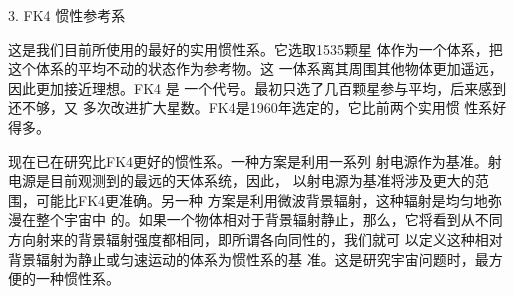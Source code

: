 \documentclass[../outline-of-mechanics.tex]{subfiles}
\begin{document}
\textsf{3. FK4 惯性参考系}

这是我们目前所使用的最好的实用惯性系。它选取1535颗星
体作为一个体系，把这个体系的平均不动的状态作为参考物。这
一体系离其周围其他物体更加遥远，因此更加接近理想。FK4
是
一个代号。最初只选了几百颗星参与平均，后来感到还不够，又
多次改进扩大星数。FK4是1960年选定的，它比前两个实用惯
性系好得多。

现在已在研究比FK4更好的惯性系。一种方案是利用一系列
射电源作为基准。射电源是目前观测到的最远的天体系统，因此，
以射电源为基准将涉及更大的范围，可能比FK4更准确。另一种
方案是利用微波背景辐射，这种辐射是均匀地弥漫在整个宇宙中
的。如果一个物体相对于背景辐射静止，那么，它将看到从不同
方向射来的背景辐射强度都相同，即所谓各向同性的，我们就可
以定义这种相对背景辐射为静止或匀速运动的体系为惯性系的基
准。这是研究宇宙问题时，最方便的一种惯性系。
\end{document}
